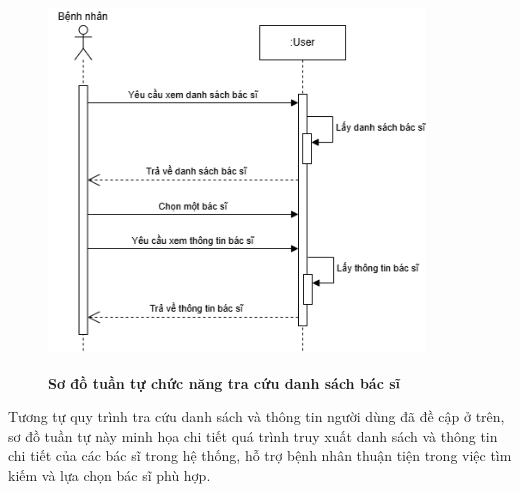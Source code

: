 \begin{figure}[H]
	\centering
	\includegraphics[width=10cm,height=10cm]{Images/sequence/user/getDoctorByPatient.drawio.png}
	\caption[Sơ đồ tuần tự chức năng tra cứu danh sách bác sĩ]{\bfseries \fontsize{12pt}{0pt}
		\selectfont Sơ đồ tuần tự chức năng tra cứu danh sách bác sĩ}
	\label{sequence_get_all_doctor} %
\end{figure}
Tương tự quy trình tra cứu danh sách và thông tin người dùng đã đề cập ở trên, sơ đồ tuần tự này minh họa chi tiết quá trình truy xuất danh sách
và thông tin chi tiết của các bác sĩ trong hệ thống, hỗ trợ bệnh nhân thuận tiện trong việc tìm kiếm và lựa chọn bác sĩ phù hợp.

